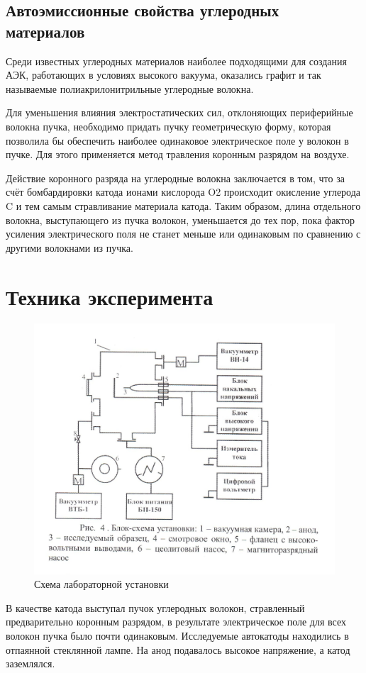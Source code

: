 \documentclass[a4paper, 12pt]{article}
\begin{document}
	\subsection{Автоэмиссионные свойства углеродных материалов}
	Среди известных углеродных материалов наиболее подходящими для создания АЭК, работающих в условиях высокого вакуума, оказались графит и так называемые полиакрилонитрильные углеродные волокна.\par
	Для уменьшения влияния электростатических сил, отклоняющих периферийные волокна пучка, необходимо придать пучку геометрическую форму, которая позволила бы обеспечить наиболее одинаковое электрическое поле у волокон в пучке. Для этого применяется метод травления коронным разрядом на воздухе.\par
	Действие коронного разряда на углеродные волокна заключается в том, что за счёт бомбардировки катода ионами кислорода O2 происходит окисление углерода C и тем самым стравливание материала катода. Таким образом, длина отдельного волокна, выступающего из пучка волокон, уменьшается до тех пор, пока фактор усиления электрического поля не станет меньше или одинаковым по сравнению с другими волокнами из пучка.
	\section{Техника эксперимента}
	\begin{figure}[!htb]
		\centering
		\includegraphics[scale=0.8]{scheme.jpg}
		\caption{Схема лабораторной установки}
	\end{figure}
	В качестве катода выступал пучок углеродных волокон, стравленный предварительно коронным разрядом, в результате электрическое поле для всех волокон пучка было почти одинаковым. Исследуемые автокатоды находились в отпаянной стеклянной лампе. На анод подавалось высокое напряжение, а катод заземлялся.
	\newpage
\end{document}
